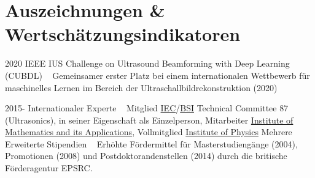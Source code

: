 \documentclass[german, print]{cv-style-wide-de}
\begin{document}
\section{Auszeichnungen \& Wertschätzungsindikatoren}
\begin{entrylist}
\entry
{2020}
{IEEE IUS Challenge on Ultrasound Beamforming with Deep Learning (CUBDL)}
{~}
{Gemeinsamer erster Platz bei einem internationalen Wettbewerb für maschinelles Lernen im Bereich der Ultraschallbildrekonstruktion (2020)}

\entry
{2015-}
{Internationaler Experte}
{~}
{Mitglied \href{https://iec.ch/dyn/www/f?p=103:7:::::FSP_ORG_ID:1281}{IEC}/\href{https://standardsdevelopment.bsigroup.com/committees/50001534}{BSI} Technical Committee 87 (Ultrasonics), in seiner Eigenschaft als Einzelperson, Mitarbeiter \href{https://ima.org.uk/}{Institute of Mathematics and its Applications}, Vollmitglied \href{https://www.iop.org/}{Institute of Physics}}
%
%
%
\entry
{Mehrere}
{Erweiterte Stipendien}
{~}
{Erhöhte Fördermittel für Masterstudiengänge (2004), Promotionen (2008) und Postdoktorandenstellen (2014) durch die britische Förderagentur EPSRC.}
\end{entrylist}

\end{document}
